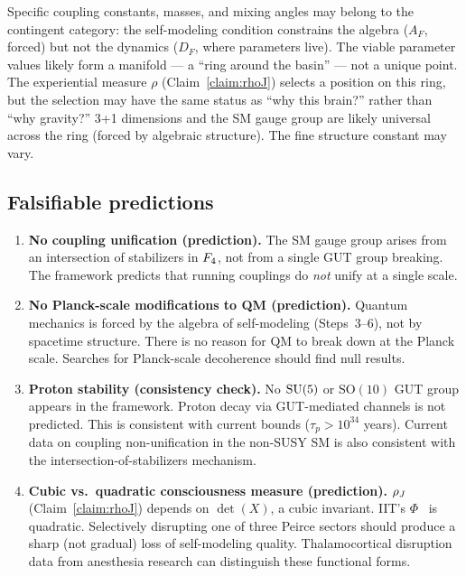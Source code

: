 Specific coupling constants, masses, and mixing angles may belong to
the contingent category: the self-modeling condition constrains the
algebra ($A_F$, forced) but not the dynamics ($D_F$, where parameters
live).  The viable parameter values likely form a manifold --- a
``ring around the basin'' --- not a unique point.  The experiential
measure $\rho$ (Claim~\ref{claim:rhoJ}) selects a position on this
ring, but the selection may
have the same status as ``why this brain?'' rather than ``why
gravity?''  3+1 dimensions and the SM gauge group are likely universal
across the ring (forced by algebraic structure).  The fine structure
constant may vary.

\subsection{Falsifiable predictions}
\label{subsec:predictions}

\begin{enumerate}
\item \textbf{No coupling unification (prediction).}  The SM gauge
  group arises from an intersection of stabilizers in $F_4$, not
  from a single GUT group breaking.  The framework predicts that
  running couplings do \emph{not} unify at a single scale.

\item \textbf{No Planck-scale modifications to QM (prediction).}
  Quantum mechanics is forced by the algebra of self-modeling
  (Steps~3--6), not by spacetime structure.  There is no reason for QM
  to break down at the Planck scale.  Searches for Planck-scale
  decoherence should find null results.

\item \textbf{Proton stability (consistency check).}  No $\mathrm{SU}(5)$ or
  $\mathrm{SO}(10)$ GUT group appears in the framework.  Proton decay
  via GUT-mediated channels is not predicted.  This is consistent with
  current bounds ($\tau_p > 10^{34}$ years).  Current data on coupling
  non-unification in the non-SUSY SM is also consistent
  with the intersection-of-stabilizers mechanism.

\item \textbf{Cubic vs.\ quadratic consciousness measure (prediction).}
  $\rho_J$ (Claim~\ref{claim:rhoJ}) depends on $\det(X)$, a cubic
  invariant.  IIT's $\Phi$~\citep{tononi2008} is quadratic.
  Selectively disrupting one of three Peirce sectors should produce a
  sharp (not gradual) loss of self-modeling quality.  Thalamocortical
  disruption data from anesthesia research can distinguish these
  functional forms.
\end{enumerate}

